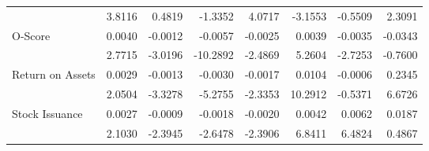 \documentclass[a4paper]{article}                 %
\begin{document}
\begin{table}[h]
{\begin{tabular}{@{}lrrrrrrr@{}}
    & 3.8116 & 0.4819 & -1.3352 & 4.0717 & -3.1553 & -0.5509 & 2.3091 \\
    \multirow{2}{*}{O-Score} & 0.0040 & -0.0012 & -0.0057 & -0.0025 & 0.0039 & -0.0035 & -0.0343 \\
    & 2.7715 & -3.0196 & -10.2892 & -2.4869 & 5.2604 & -2.7253 & -0.7600 \\
    \multirow{2}{*}{Return on Assets} & 0.0029 & -0.0013 & -0.0030 & -0.0017 & 0.0104 & -0.0006 & 0.2345 \\
    & 2.0504 & -3.3278 & -5.2755 & -2.3353 & 10.2912 & -0.5371 & 6.6726 \\
    \multirow{2}{*}{Stock Issuance} & 0.0027 & -0.0009 & -0.0018 & -0.0020 & 0.0042 & 0.0062 & 0.0187 \\
    & 2.1030 & -2.3945 & -2.6478 & -2.3906 & 6.8411 & 6.4824 & 0.4867 \\ \bottomrule
    \end{tabular}%
    }
\end{table}
\end{document}
